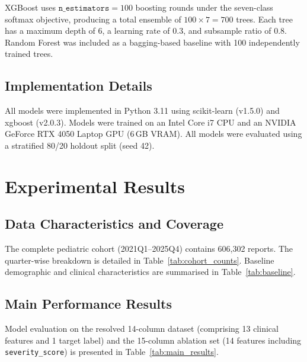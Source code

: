 \documentclass[10pt,twocolumn]{article}
\begin{document}
XGBoost uses $\texttt{n\_estimators}=100$ boosting rounds under the seven-class softmax objective, producing a total ensemble of $100 \times 7 = 700$ trees. Each tree has a maximum depth of 6, a learning rate of 0.3, and subsample ratio of 0.8. Random Forest was included as a bagging-based baseline with 100 independently trained trees.
 
\subsection{Implementation Details}
All models were implemented in Python 3.11 using \textsf{scikit-learn} (v1.5.0) and \textsf{xgboost} (v2.0.3). Models were trained on an Intel Core i7 CPU and an NVIDIA GeForce RTX 4050 Laptop GPU (6\,GB VRAM). All models were evaluated using a stratified 80/20 holdout split (seed 42).
 
\section{Experimental Results}
 
\subsection{Data Characteristics and Coverage}
The complete pediatric cohort (2021Q1--2025Q4) contains 606{,}302 reports. The quarter-wise breakdown is detailed in Table~\ref{tab:cohort_counts}. Baseline demographic and clinical characteristics are summarised in Table~\ref{tab:baseline}.
 
\subsection{Main Performance Results}
Model evaluation on the resolved 14-column dataset (comprising 13 clinical features and 1 target label) and the 15-column ablation set (14 features including \texttt{severity\_score}) is presented in Table~\ref{tab:main_results}.
 
\end{document}
